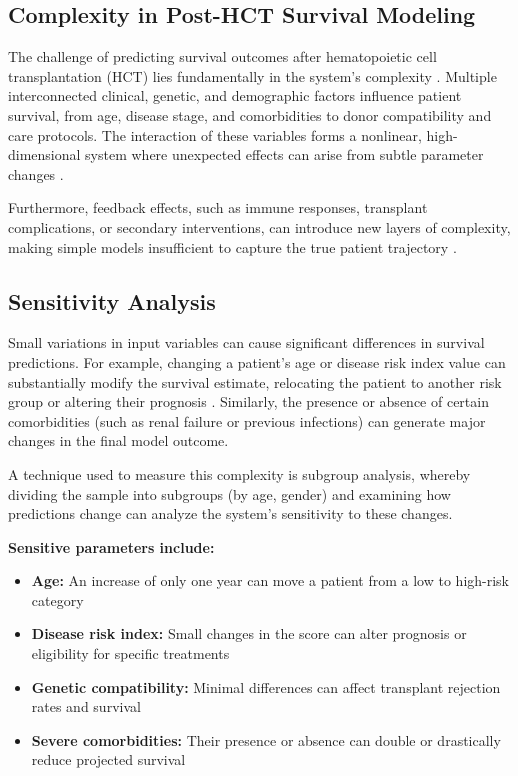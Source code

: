 \subsection{Complexity in Post-HCT Survival Modeling}

The challenge of predicting survival outcomes after hematopoietic cell transplantation (HCT) lies fundamentally in the system's complexity \cite{astct_simplification}. Multiple interconnected clinical, genetic, and demographic factors influence patient survival, from age, disease stage, and comorbidities to donor compatibility and care protocols. The interaction of these variables forms a nonlinear, high-dimensional system where unexpected effects can arise from subtle parameter changes \cite{frontiers_ai_hct}.

\vspace{0.3cm}

Furthermore, feedback effects, such as immune responses, transplant complications, or secondary interventions, can introduce new layers of complexity, making simple models insufficient to capture the true patient trajectory \cite{stmcls_clonality}.

\subsection{Sensitivity Analysis}

Small variations in input variables can cause significant differences in survival predictions. For example, changing a patient's age or disease risk index value can substantially modify the survival estimate, relocating the patient to another risk group or altering their prognosis \cite{mdpi_cancers}. Similarly, the presence or absence of certain comorbidities (such as renal failure or previous infections) can generate major changes in the final model outcome.

\vspace{0.3cm}

A technique used to measure this complexity is subgroup analysis, whereby dividing the sample into subgroups (by age, gender) and examining how predictions change can analyze the system's sensitivity to these changes.

\textbf{Sensitive parameters include:}
\begin{itemize}
    \item \textbf{Age:} An increase of only one year can move a patient from a low to high-risk category \cite{stmcls_clonality}
    \item \textbf{Disease risk index:} Small changes in the score can alter prognosis or eligibility for specific treatments
    \item \textbf{Genetic compatibility:} Minimal differences can affect transplant rejection rates and survival
    \item \textbf{Severe comorbidities:} Their presence or absence can double or drastically reduce projected survival
\end{itemize}

